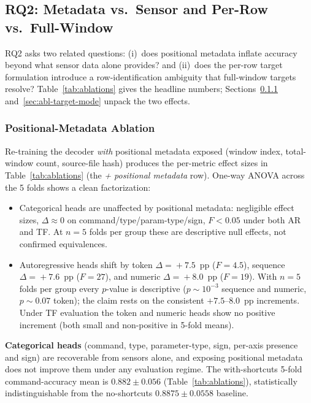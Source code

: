 \documentclass[sensors,article,submit,moreauthors,pdftex]{Definitions/mdpi}
\begin{document}
\subsection{RQ2: Metadata vs.\ Sensor and Per-Row vs.\ Full-Window}
\label{sec:results-rq2}

RQ2 asks two related questions: (i)~does positional metadata inflate accuracy beyond what sensor data alone provides? and (ii)~does the per-row target formulation introduce a row-identification ambiguity that full-window targets resolve? Table~\ref{tab:ablations} gives the headline numbers; Sections~\ref{sec:abl-positional} and~\ref{sec:abl-target-mode} unpack the two effects.



\subsubsection{Positional-Metadata Ablation}
\label{sec:abl-positional}
Re-training the decoder \emph{with} positional metadata exposed (window index, total-window count, source-file hash) produces the per-metric effect sizes in Table~\ref{tab:ablations} (the \emph{+ positional metadata} row). One-way ANOVA across the 5 folds shows a clean factorization:

\begin{itemize}
\item Categorical heads are unaffected by positional metadata: negligible effect sizes, $\Delta\!\approx\!0$ on command/type/param-type/sign, $F<0.05$ under both AR and TF. At $n\!=\!5$ folds per group these are descriptive null effects, not confirmed equivalences.
\item Autoregressive heads shift by token $\Delta\!=\!+7.5$~pp ($F\!=\!4.5$), sequence $\Delta\!=\!+7.6$~pp ($F\!=\!27$), and numeric $\Delta\!=\!+8.0$~pp ($F\!=\!19$). With $n\!=\!5$ folds per group every $p$-value is descriptive ($p\!\sim\!10^{-3}$ sequence and numeric, $p\!\sim\!0.07$ token); the claim rests on the consistent $+7.5$--$8.0$~pp increments. Under TF evaluation the token and numeric heads show no positive increment (both small and non-positive in 5-fold means).
\end{itemize}

\textbf{Categorical heads} (command, type, parameter-type, sign, per-axis presence and sign) are recoverable from sensors alone, and exposing positional metadata does not improve them under any evaluation regime. The with-shortcuts 5-fold command-accuracy mean is $0.882 \pm 0.056$ (Table~\ref{tab:ablations}), statistically indistinguishable from the no-shortcuts $0.8875 \pm 0.0558$ baseline.
\end{document}
